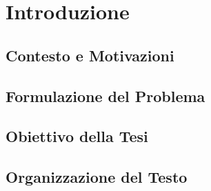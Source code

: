 \chapter{Introduzione}
\label{chap:introduzione}

\section{Contesto e Motivazioni}


\section{Formulazione del Problema}


\section{Obiettivo della Tesi}


\section{Organizzazione del Testo}
